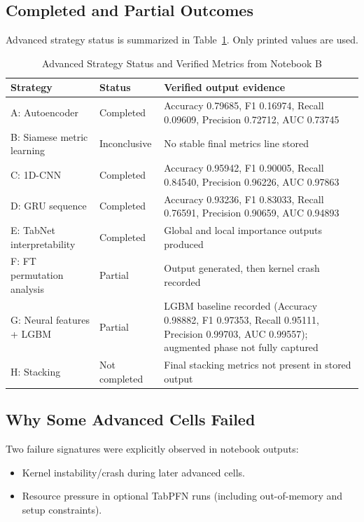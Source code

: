 \documentclass[10pt,journal]{IEEEtran}
\begin{document}
\subsection{Completed and Partial Outcomes}
Advanced strategy status is summarized in Table~\ref{tab:advanced_status}. Only printed values are used.

\begin{table}[!t]
\caption{Advanced Strategy Status and Verified Metrics from Notebook B}
\label{tab:advanced_status}
\centering
\begin{tabular}{p{3.0cm}p{2.1cm}p{9.8cm}}
\toprule
Strategy & Status & Verified output evidence \\
\midrule
A: Autoencoder & Completed & Accuracy 0.79685, F1 0.16974, Recall 0.09609, Precision 0.72712, AUC 0.73745 \\
B: Siamese metric learning & Inconclusive & No stable final metrics line stored \\
C: 1D-CNN & Completed & Accuracy 0.95942, F1 0.90005, Recall 0.84540, Precision 0.96226, AUC 0.97863 \\
D: GRU sequence & Completed & Accuracy 0.93236, F1 0.83033, Recall 0.76591, Precision 0.90659, AUC 0.94893 \\
E: TabNet interpretability & Completed & Global and local importance outputs produced \\
F: FT permutation analysis & Partial & Output generated, then kernel crash recorded \\
G: Neural features + LGBM & Partial & LGBM baseline recorded (Accuracy 0.98882, F1 0.97353, Recall 0.95111, Precision 0.99703, AUC 0.99557); augmented phase not fully captured \\
H: Stacking & Not completed & Final stacking metrics not present in stored output \\
\bottomrule
\end{tabular}
\end{table}

\subsection{Why Some Advanced Cells Failed}
Two failure signatures were explicitly observed in notebook outputs:
\begin{itemize}
\item Kernel instability/crash during later advanced cells.
\item Resource pressure in optional TabPFN runs (including out-of-memory and setup constraints).
\end{itemize}
\end{document}
